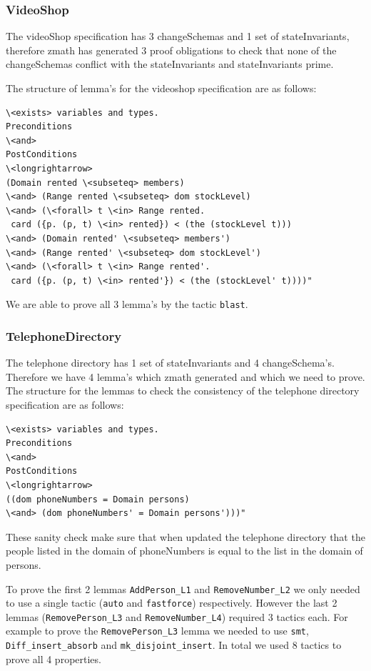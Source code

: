 \subsubsection{VideoShop}

The videoShop specification has 3 changeSchemas and 1 set of stateInvariants,
therefore \gls{zmath} has generated 3 proof obligations to check that none of
the changeSchemas conflict with the stateInvariants and stateInvariants prime.

The structure of lemma's for the videoshop specification are as follows:

\begin{verbatim}
\<exists> variables and types.
Preconditions
\<and>
PostConditions
\<longrightarrow>
(Domain rented \<subseteq> members)
\<and> (Range rented \<subseteq> dom stockLevel)
\<and> (\<forall> t \<in> Range rented.
 card ({p. (p, t) \<in> rented}) < (the (stockLevel t)))
\<and> (Domain rented' \<subseteq> members')
\<and> (Range rented' \<subseteq> dom stockLevel')
\<and> (\<forall> t \<in> Range rented'.
 card ({p. (p, t) \<in> rented'}) < (the (stockLevel' t))))"
\end{verbatim}

We are able to prove all 3 lemma's by the tactic \verb|blast|. 

\subsubsection{TelephoneDirectory}

The telephone directory has 1 set of stateInvariants and 4 changeSchema's.
Therefore we have 4 lemma's which \gls{zmath} generated and which we need to
prove. The structure for the lemmas to check the consistency of the telephone
directory specification are as follows:

\begin{verbatim}
\<exists> variables and types.
Preconditions
\<and>
PostConditions
\<longrightarrow>
((dom phoneNumbers = Domain persons)
\<and> (dom phoneNumbers' = Domain persons')))"
\end{verbatim}

These sanity check make sure that when updated the telephone directory that the
people listed in the domain of phoneNumbers is equal to the list in the domain
of persons.

To prove the first 2 lemmas \verb|AddPerson_L1| and \verb|RemoveNumber_L2| we
only needed to use a single tactic (\verb|auto| and \verb|fastforce|)
respectively. However the last 2 lemmas (\verb|RemovePerson_L3| and
\verb|RemoveNumber_L4|) required 3 tactics each. For example to prove the
\verb|RemovePerson_L3| lemma we needed to use \verb|smt|,
\verb|Diff_insert_absorb| and \verb|mk_disjoint_insert|. In total we used 8
tactics to prove all 4 properties.

